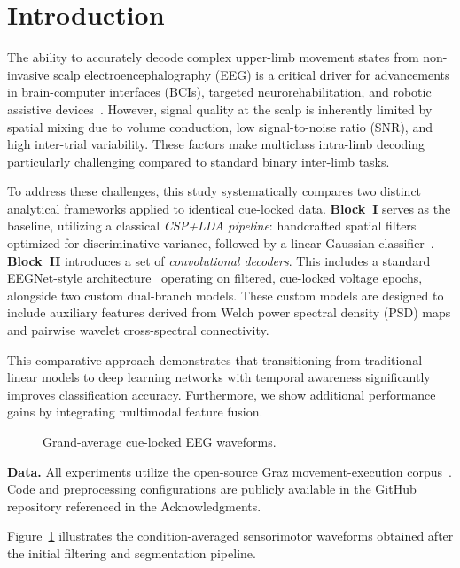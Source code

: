\section{Introduction}
\label{sec:intro}

The ability to accurately decode complex upper-limb movement states from non-invasive scalp electroencephalography (EEG) is a critical driver for advancements in brain-computer interfaces (BCIs), targeted neurorehabilitation, and robotic assistive devices~\cite{ofner2017upper}. However, signal quality at the scalp is inherently limited by spatial mixing due to volume conduction, low signal-to-noise ratio (SNR), and high inter-trial variability. These factors make multiclass intra-limb decoding particularly challenging compared to standard binary inter-limb tasks.

To address these challenges, this study systematically compares two distinct analytical frameworks applied to identical cue-locked data. 
\textbf{Block~I} serves as the baseline, utilizing a classical \emph{CSP+LDA pipeline}: handcrafted spatial filters optimized for discriminative variance, followed by a linear Gaussian classifier~\cite{gramfort2013meg}. 
\textbf{Block~II} introduces a set of \emph{convolutional decoders}. This includes a standard EEGNet-style architecture~\cite{lawhern2018eegnet} operating on filtered, cue-locked voltage epochs, alongside two custom dual-branch models. These custom models are designed to include auxiliary features derived from Welch power spectral density (PSD) maps and pairwise wavelet cross-spectral connectivity.

This comparative approach demonstrates that transitioning from traditional linear models to deep learning networks with temporal awareness significantly improves classification accuracy. Furthermore, we show additional performance gains by integrating multimodal feature fusion.

\begin{figure}[t]
  \centering
   
  \caption{Grand-average cue-locked EEG waveforms.}
  \label{fig:grandavg}
\end{figure}

\textbf{Data.} All experiments utilize the open-source Graz movement-execution corpus~\cite{ofner2017upper}. Code and preprocessing configurations are publicly available in the GitHub repository referenced in the Acknowledgments.

Figure~\ref{fig:grandavg} illustrates the condition-averaged sensorimotor waveforms obtained after the initial filtering and segmentation pipeline.
